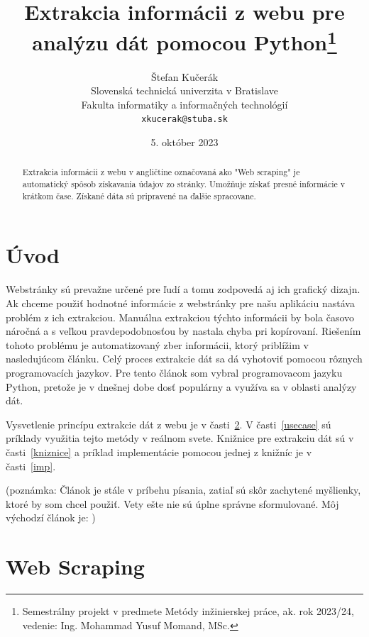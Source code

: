 \documentclass[10pt,twoside,slovak,a4paper]{article}
\title{Extrakcia informácii z webu pre analýzu dát pomocou Python\thanks{Semestrálny projekt v predmete Metódy inžinierskej práce, ak. rok 2023/24, vedenie: Ing. Mohammad Yusuf Momand, MSc.}} %
\author{Štefan Kučerák\\[2pt]
	{\small Slovenská technická univerzita v Bratislave}\\
	{\small Fakulta informatiky a informačných technológií}\\
	{\small \texttt{xkucerak@stuba.sk}}
	}
\date{\small 5. október 2023} %
\begin{document}
\maketitle


\begin{abstract}
Extrakcia informácii z webu v angličtine označovaná ako "Web scraping" je automatický spôsob získavania údajov zo stránky. Umožňuje získať presné informácie v krátkom čase. Získané dáta sú pripravené na ďalšie spracovane.

\end{abstract}



\section{Úvod}

Webstránky sú prevažne určené pre ľudí a tomu zodpovedá aj ich grafický dizajn. Ak chceme použiť hodnotné informácie z webstránky pre našu aplikáciu nastáva problém z ich extrakciou. Manuálna extrakciou týchto informácii by bola časovo náročná a s veľkou pravdepodobnosťou by nastala chyba pri kopírovaní. Riešením tohoto problému je automatizovaný zber informácii, ktorý priblížim v nasledujúcom článku. Celý proces extrakcie dát sa dá vyhotoviť pomocou rôznych programovacích jazykov. Pre tento článok som vybral programovacom jazyku Python, pretože je v dnešnej dobe dosť populárny a využíva sa v oblasti analýzy dát.


Vysvetlenie princípu extrakcie dát z webu je v časti~\ref{webscraping}. V časti~\ref{usecase} sú príklady využitia tejto metódy v reálnom svete. Knižnice pre extrakciu dát sú v časti~\ref{kniznice} a príklad implementácie pomocou jednej z knižníc je v časti~\ref{imp}.

(poznámka: Článok je stále v príbehu písania, zatiaľ sú skôr zachytené myšlienky, ktoré by som chcel použiť. Vety ešte nie sú úplne správne sformulované. Môj východzí článok je: \cite{10145369})

\section{Web Scraping}\label{webscraping}
\end{document}
